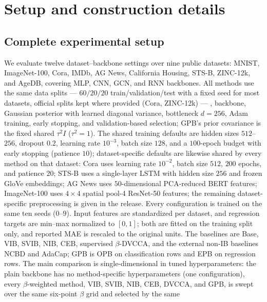 \section{Setup and construction details}
\label{app:method}

\subsection{Complete experimental setup}
\label{app:setup-details}
We evaluate twelve dataset--backbone settings over nine public datasets:
MNIST, ImageNet-100, Cora, IMDb, AG News, California Housing, STS-B,
ZINC-12k, and AgeDB, covering MLP, CNN, GCN, and RNN backbones. All
methods use the same data splits --- $60/20/20$ train/validation/test
with a fixed seed for most datasets, official splits kept where provided
(Cora, ZINC-12k) --- , backbone, Gaussian posterior with learned diagonal
variance, bottleneck $d=256$, Adam training, early stopping, and
validation-based selection; GPB's prior covariance is the
fixed shared $\tau^2I$ ($\tau^2=1$). The shared training defaults are
hidden sizes $512$--$256$, dropout $0.2$, learning rate $10^{-3}$, batch
size $128$, and a $100$-epoch budget with early stopping (patience
$10$); dataset-specific defaults are likewise shared by every method on
that dataset: Cora uses learning rate $10^{-2}$, batch size $512$,
$200$ epochs, and patience $20$; STS-B uses a single-layer LSTM with
hidden size $256$ and frozen GloVe embeddings; AG News uses
$50$-dimensional PCA-reduced BERT features; ImageNet-100 uses $4\times4$
spatial pool-4 ResNet-50 features; the remaining dataset-specific
preprocessing is given in the release. Every configuration is trained
on the same ten seeds ($0$--$9$). Input features are standardized per
dataset, and regression targets are min--max normalized to $[0,1]$;
both are fitted on the training split only, and reported MAE is
rescaled to the original units. The baselines are Base, VIB, SVIB,
NIB, CEB, supervised $\beta$-DVCCA, and the external non-IB baselines
NCBD and AdaCap; GPB is OPB on classification rows and EPB on regression rows. The main
comparison is single-dimensional in tuned hyperparameters: the plain
backbone has no method-specific hyperparameters (one configuration),
every $\beta$-weighted method, VIB, SVIB, NIB, CEB, DVCCA, and GPB, is
swept over the same six-point $\beta$ grid and selected by the same
